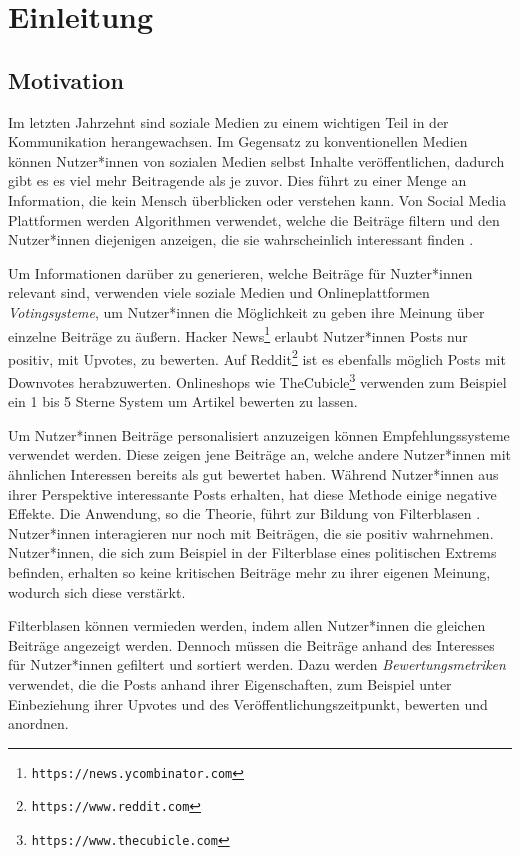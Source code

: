 \chapter{Einleitung}

\section{Motivation}

Im letzten Jahrzehnt sind soziale Medien zu einem wichtigen Teil in der Kommunikation herangewachsen. Im Gegensatz zu konventionellen Medien können Nutzer*innen von sozialen Medien selbst Inhalte veröffentlichen, dadurch gibt es es viel mehr Beitragende als je zuvor. Dies führt zu einer Menge an Information, die kein Mensch überblicken oder verstehen kann. Von Social Media Plattformen werden Algorithmen verwendet, welche die Beiträge filtern und den Nutzer*innen diejenigen anzeigen, die sie wahrscheinlich interessant finden \cite{Sarwar2001285}. 

Um Informationen darüber zu generieren, welche Beiträge für Nuzter*innen relevant sind, verwenden viele soziale Medien und Onlineplattformen \textit{Votingsysteme}, um Nutzer*innen die Möglichkeit zu geben ihre Meinung über einzelne Beiträge zu äußern. Hacker News\footnote{\texttt{https://news.ycombinator.com}} erlaubt Nutzer*innen Posts nur positiv, mit Upvotes, zu bewerten. Auf Reddit\footnote{\texttt{https://www.reddit.com}} ist es ebenfalls möglich Posts mit Downvotes herabzuwerten. Onlineshops wie TheCubicle\footnote{\texttt{https://www.thecubicle.com}} verwenden zum Beispiel ein 1 bis 5 Sterne System um Artikel bewerten zu lassen.

Um Nutzer*innen Beiträge personalisiert anzuzeigen können Empfehlungssysteme verwendet werden. Diese zeigen jene Beiträge an, welche andere Nutzer*innen mit ähnlichen Interessen bereits als gut bewertet haben. Während Nutzer*innen aus ihrer Perspektive interessante Posts erhalten, hat diese Methode einige negative Effekte. Die Anwendung, so die Theorie, führt zur Bildung von Filterblasen \cite{Flaxman2016298}. Nutzer*innen interagieren nur noch mit Beiträgen, die sie positiv wahrnehmen. Nutzer*innen, die sich zum Beispiel in der Filterblase eines politischen Extrems befinden, erhalten so keine kritischen Beiträge mehr zu ihrer eigenen Meinung, wodurch sich diese verstärkt. 

Filterblasen können vermieden werden, indem allen Nutzer*innen die gleichen Beiträge angezeigt werden. Dennoch müssen die Beiträge anhand des Interesses für Nutzer*innen gefiltert und sortiert werden. Dazu werden \textit{Bewertungsmetriken} verwendet, die die Posts anhand ihrer Eigenschaften, zum Beispiel unter Einbeziehung ihrer Upvotes und des Veröffentlichungszeitpunkt, bewerten und anordnen.

